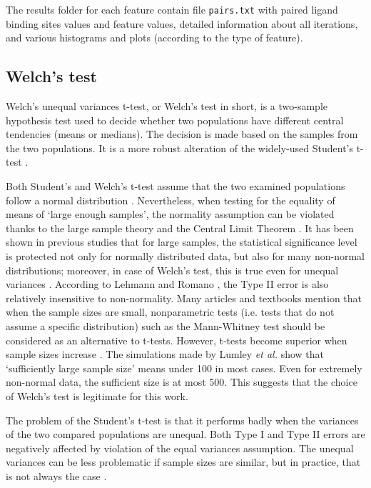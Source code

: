 The results folder for each feature contain file \texttt{pairs.txt} with paired ligand binding sites values and feature values, detailed information about all iterations, and various histograms and plots (according to the type of feature). 


\subsection{Welch's test} \label{s:welchs}

Welch's unequal variances t-test, or Welch's test in short, is a two-sample hypothesis test used to decide whether two populations have different central tendencies (means or medians). The decision is made based on the samples from the two populations. It is a more robust alteration of the widely-used Student's t-test \cite{welch}.

Both Student's and Welch's t-test assume that the two examined populations follow a normal distribution \cite{welch}. Nevertheless, when testing for the equality of means of `large enough samples', the normality assumption can be violated thanks to the large sample theory and the Central Limit Theorem \cite{lehmann}. It has been shown in previous studies that for large samples, the statistical significance level is protected not only for normally distributed data, but also for many non-normal distributions; moreover, in case of Welch's test, this is true even for unequal variances \cite{zimmerman_zumbo_1993, zumbo_coulombe_1997, lumley}. According to  Lehmann and Romano \cite{lehmann}, the Type II error is also relatively insensitive to non-normality. Many articles and textbooks mention that when the sample sizes are small, nonparametric tests (i.e. tests that do not assume a specific distribution) such as the Mann-Whitney test \cite{mann} should be considered as an alternative to t-tests.
However, t-tests become superior when sample sizes increase \cite{zimmerman1998, lumley}. The simulations made by Lumley \textit{et al.} \cite{lumley} show that `sufficiently large sample size' means under 100 in most cases. Even for extremely non-normal data, the sufficient size is at most 500. This suggests that the choice of Welch's test is legitimate for this work.

The problem of the Student's t-test is that it performs badly when the variances of the two compared populations are unequal. Both Type I and Type II errors are negatively affected by violation of the equal variances assumption. The unequal variances can be less problematic if sample sizes are similar, but in practice, that is not always the case \cite{ruxton}.

